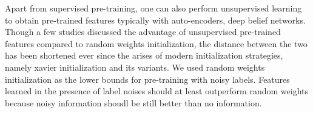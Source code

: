 
Apart from supervised pre-training, one can also perform unsupervised learning to obtain pre-trained features typically with auto-encoders\cite{vincent2010stacked,masci2011stacked}, deep belief networks\cite{hinton2006fast,lee2009convolutional}.
Though a few studies\cite{erhan2009difficulty,erhan2010does,bengio2012deep} discussed the advantage of unsupervised pre-trained features compared to random weights initialization, the distance between the two has been shortened ever since the arises of modern initialization strategies, namely xavier initialization\cite{glorot2010understanding} and its variants.
We used random weights initialization as the lower bounds for pre-training with noisy labels.
Features learned in the presence of label noises should at least outperform random weights because noisy information shoudl be still better than no information.


